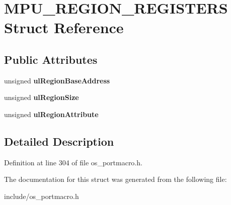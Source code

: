 \hypertarget{structMPU__REGION__REGISTERS}{}\section{M\+P\+U\+\_\+\+R\+E\+G\+I\+O\+N\+\_\+\+R\+E\+G\+I\+S\+T\+E\+RS Struct Reference}
\label{structMPU__REGION__REGISTERS}
\subsection*{Public Attributes}
\begin{DoxyCompactItemize}
\item 
\mbox{\label{structMPU__REGION__REGISTERS_a776a8879c299ab38ec4d36bc838e8d43}} 
unsigned {\bfseries ul\+Region\+Base\+Address}
\item 
\mbox{\label{structMPU__REGION__REGISTERS_a7d4b4c99742cbbe0b3ce6a194c303ae4}} 
unsigned {\bfseries ul\+Region\+Size}
\item 
\mbox{\label{structMPU__REGION__REGISTERS_a51c0ae19c25b644697926a9264e183de}} 
unsigned {\bfseries ul\+Region\+Attribute}
\end{DoxyCompactItemize}


\subsection{Detailed Description}


Definition at line 304 of file os\+\_\+portmacro.\+h.



The documentation for this struct was generated from the following file\+:\begin{DoxyCompactItemize}
\item 
include/os\+\_\+portmacro.\+h\end{DoxyCompactItemize}
